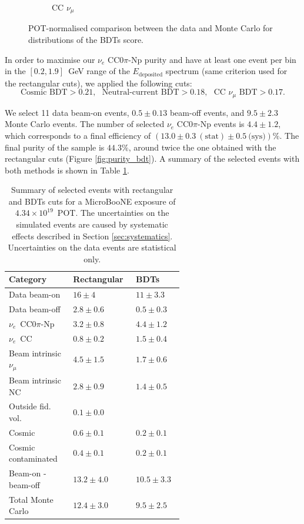 \begin{figure}[htbp]
\begin{subfigure}{0.32\textwidth}
    \caption{CC $\nu_{\mu}$} 
  \end{subfigure}
  \caption{POT-normalised comparison between the data and Monte Carlo for distributions of the BDTs score.}\label{fig:bdt_datamc}
\end{figure}

In order to maximise our $\nu_e$ CC0$\pi$-Np purity and have at least one event per bin in the $[0.2,1.9]$~GeV range of the $E_{\mathrm{deposited}}$ spectrum (same criterion used for the rectangular cuts), we applied the following cuts:
\begin{equation}
    \text{Cosmic BDT} > 0.21,~~~\text{Neutral-current BDT} > 0.18,~~~\text{CC }\nu_{\mu}\text{ BDT} > 0.17.
\end{equation}

We select 11 data beam-on events, $0.5\pm0.13$ beam-off events, and $9.5\pm2.3$ Monte Carlo events. The number of selected $\nu_e$ CC0$\pi$-Np events is $4.4\pm1.2$, which corresponds to a final efficiency of $(13.0\pm0.3~\mathrm{(stat)}\pm0.5~\text{(sys)})\%$. The final purity of the sample is $44.3\%$, around twice the one obtained with the rectangular cuts (Figure \ref{fig:purity_bdt}).
A summary of the selected events with both methods is shown in Table \ref{tab:overview}.

\begin{table}[htbp]
   \centering
      \caption{Summary of selected events with rectangular and BDTs cuts for a MicroBooNE exposure of $4.34\times10^{19}$~POT. The uncertainties on the simulated events are caused by systematic effects described in Section \ref{sec:systematics}. Uncertainties on the data events are statistical only.}\label{tab:overview}
   \begin{tabular}{
   p{0.27\linewidth}
   >{\raggedleft\arraybackslash}p{0.16\linewidth}
   >{\raggedleft\arraybackslash}p{0.16\linewidth}}
     \toprule
     Category & Rectangular & BDTs \\
     \midrule
     Data beam-on & $16\pm4$ & $11\pm3.3$ \\
     Data beam-off & $2.8\pm0.6$ & $0.5\pm0.3$ \\
     $\nu_e$~CC0$\pi$-Np & $3.2\pm0.8$ & $4.4\pm1.2$\\
     $\nu_e$~CC & $0.8\pm0.2$ & $1.5\pm0.4$ \\
     Beam intrinsic $\nu_{\mu}$ & $4.5\pm1.5$ & $1.7\pm0.6$ \\
     Beam intrinsic NC & $2.8\pm0.9$ & $1.4\pm0.5$ \\
     Outside fid. vol. & $0.1\pm0.0$ & 0 \\
     Cosmic & $0.6\pm0.1$ & $0.2\pm0.1$ \\
     Cosmic contaminated & $0.4\pm0.1$ & $0.2\pm0.1$ \\
     \midrule
     Beam-on - beam-off & $13.2\pm4.0$ & $10.5\pm3.3$ \\
     Total Monte Carlo & $12.4\pm3.0$ & $9.5\pm2.5$ \\
     \bottomrule
   \end{tabular}
\end{table}


